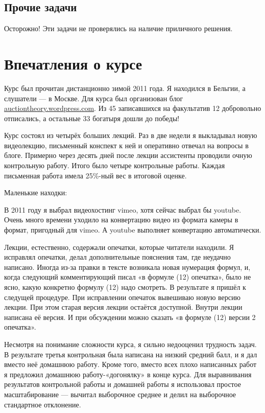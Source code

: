 \documentclass[11pt, openany]{book}
\numberwithin{equation}{page} %
\theoremstyle{definition} %
\theoremstyle{definition}
\theoremstyle{definition}
\begin{document}


\section{Прочие задачи}

Осторожно! Эти задачи не проверялись на наличие приличного решения.




\chapter*{Впечатления о курсе}

Курс был прочитан дистанционно зимой 2011 года. Я находился в Бельгии, а слушатели — в Москве. Для курса был организован блог \url{auctiontheory.wordpress.com}. Из 45 записавшихся на факультатив 12 добровольно отписались, а остальные 33 богатыря дошли до победы!

Курс состоял из четырёх больших лекций. Раз в две недели я выкладывал новую видеолекцию, письменный конспект к ней и оперативно отвечал на вопросы в блоге. Примерно через десять дней после лекции ассистенты проводили очную контрольную работу. Итого было четыре контрольные работы. Каждая письменная работа имела 25\%-ный вес в итоговой оценке.

Маленькие находки:

В 2011 году я выбрал видеохостинг vimeo, хотя сейчас выбрал бы youtube. Очень много времени уходило на конвертацию видео из формата камеры в формат, пригодный для vimeo. А youtube выполняет конвертацию автоматически.

Лекции, естественно, содержали опечатки, которые читатели находили. Я исправлял опечатки, делал дополнительные пояснения там, где неудачно написано. Иногда из-за правки в тексте возникала новая нумерация формул, и, когда следующий комментирующий писал «в формуле (12) опечатка», было не ясно, какую конкретно формулу (12) надо смотреть. В результате я пришёл к следущей процедуре. При исправлении опечаток вывешиваю новую версию лекции. При этом старая версия лекции остаётся доступной. Внутри лекции написана её версия. И при обсуждении можно сказать «в формуле (12) версии 2 опечатка».

Несмотря на понимание сложности курса, я сильно недооценил трудность задач. В результате третья контрольная была написана на низкий средний балл, и я дал вместо неё домашнюю работу. Кроме того, вместо всех плохо написанных работ я предложил домашнюю работу-«догонялку» в конце курса. Для выравнивания результатов контрольной работы и домашней работы я использовал простое масштабирование — вычитал выборочное среднее и делил на выборочное стандартное отклонение.
\end{document}
